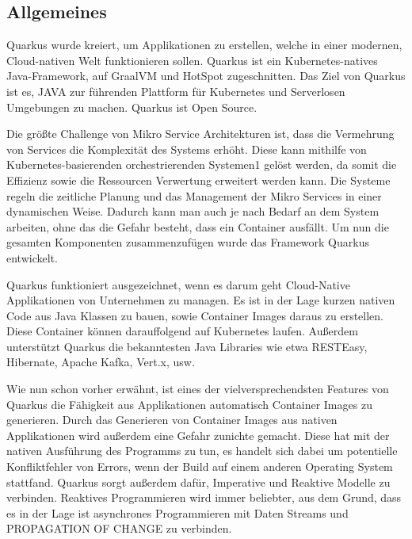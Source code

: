 
\subsection{Allgemeines}
Quarkus wurde kreiert, um Applikationen zu erstellen, welche in einer modernen, Cloud-nativen Welt funktionieren sollen. Quarkus ist ein Kubernetes-natives Java-Framework, auf GraalVM und HotSpot zugeschnitten. Das Ziel von Quarkus ist es, JAVA zur führenden Plattform für Kubernetes und Serverlosen Umgebungen zu machen. Quarkus ist Open Source. 

Die größte Challenge von Mikro Service Architekturen ist, dass die Vermehrung von Services die Komplexität des Systems erhöht. Diese kann mithilfe von Kubernetes-basierenden orchestrierenden Systemen1 gelöst werden, da somit die Effizienz sowie die Ressourcen Verwertung erweitert werden kann. Die Systeme regeln die zeitliche Planung und das Management der Mikro Services in einer dynamischen Weise. Dadurch kann man auch je nach Bedarf an dem System arbeiten, ohne das die Gefahr besteht, dass ein Container ausfällt. Um nun die gesamten Komponenten zusammenzufügen wurde das Framework Quarkus entwickelt. 

Quarkus funktioniert ausgezeichnet, wenn es darum geht Cloud-Native Applikationen von Unternehmen zu managen. Es ist in der Lage kurzen nativen Code aus Java Klassen zu bauen, sowie Container Images daraus zu erstellen. Diese Container können darauffolgend auf Kubernetes laufen. Außerdem unterstützt Quarkus die bekanntesten Java Libraries wie etwa RESTEasy, Hibernate, Apache Kafka, Vert.x, usw. 

Wie nun schon vorher erwähnt, ist eines der vielversprechendsten Features von Quarkus die Fähigkeit aus Applikationen automatisch Container Images zu generieren. Durch das Generieren von Container Images aus nativen Applikationen wird außerdem eine Gefahr zunichte gemacht. Diese hat mit der nativen Ausführung des Programms zu tun, es handelt sich dabei um potentielle Konfliktfehler von Errors, wenn der Build auf einem anderen Operating System stattfand. 
Quarkus sorgt außerdem dafür, Imperative und Reaktive Modelle zu verbinden. Reaktives Programmieren wird immer beliebter, aus dem Grund, dass es in der Lage ist asynchrones Programmieren mit Daten Streams und PROPAGATION OF CHANGE zu verbinden.

